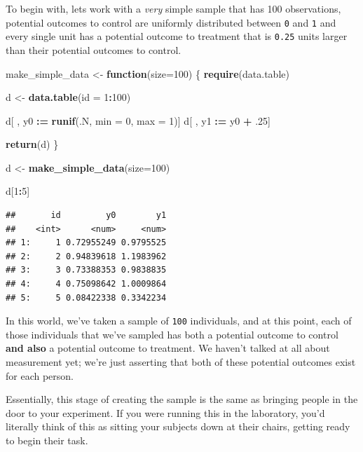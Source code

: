 \documentclass[
]{article}
\newenvironment{Shaded}{\begin{snugshade}}{\end{snugshade}}
\newcommand{\AttributeTok}[1]{\textcolor[rgb]{0.13,0.29,0.53}{#1}}
\newcommand{\ControlFlowTok}[1]{\textcolor[rgb]{0.13,0.29,0.53}{\textbf{#1}}}
\newcommand{\DecValTok}[1]{\textcolor[rgb]{0.00,0.00,0.81}{#1}}
\newcommand{\FunctionTok}[1]{\textcolor[rgb]{0.13,0.29,0.53}{\textbf{#1}}}
\newcommand{\NormalTok}[1]{#1}
\newcommand{\OtherTok}[1]{\textcolor[rgb]{0.56,0.35,0.01}{#1}}
\newcommand{\SpecialCharTok}[1]{\textcolor[rgb]{0.81,0.36,0.00}{\textbf{#1}}}
\theoremstyle{definition}
\theoremstyle{definition}
\theoremstyle{definition}
\theoremstyle{definition}
\theoremstyle{remark}
\begin{document}
To begin with, lets work with a \emph{very} simple sample that has 100 observations, potential outcomes to control are uniformly distributed between \texttt{0} and \texttt{1} and every single unit has a potential outcome to treatment that is \texttt{0.25} units larger than their potential outcomes to control.

\begin{Shaded}
\begin{Highlighting}[]
\NormalTok{make\_simple\_data }\OtherTok{\textless{}{-}} \ControlFlowTok{function}\NormalTok{(}\AttributeTok{size=}\DecValTok{100}\NormalTok{) \{ }
  \FunctionTok{require}\NormalTok{(data.table) }
  
\NormalTok{  d }\OtherTok{\textless{}{-}} \FunctionTok{data.table}\NormalTok{(}\AttributeTok{id =} \DecValTok{1}\SpecialCharTok{:}\DecValTok{100}\NormalTok{)  }
  
\NormalTok{  d[ , y0 }\SpecialCharTok{:=} \FunctionTok{runif}\NormalTok{(.N, }\AttributeTok{min =} \DecValTok{0}\NormalTok{, }\AttributeTok{max =} \DecValTok{1}\NormalTok{)]}
\NormalTok{  d[ , y1 }\SpecialCharTok{:=}\NormalTok{ y0 }\SpecialCharTok{+}\NormalTok{ .}\DecValTok{25}\NormalTok{]}
  
  \FunctionTok{return}\NormalTok{(d)}
\NormalTok{  \}}

\NormalTok{d }\OtherTok{\textless{}{-}} \FunctionTok{make\_simple\_data}\NormalTok{(}\AttributeTok{size=}\DecValTok{100}\NormalTok{)}

\NormalTok{d[}\DecValTok{1}\SpecialCharTok{:}\DecValTok{5}\NormalTok{]}
\end{Highlighting}
\end{Shaded}

\begin{verbatim}
##       id         y0        y1
##    <int>      <num>     <num>
## 1:     1 0.72955249 0.9795525
## 2:     2 0.94839618 1.1983962
## 3:     3 0.73388353 0.9838835
## 4:     4 0.75098642 1.0009864
## 5:     5 0.08422338 0.3342234
\end{verbatim}

In this world, we've taken a sample of \texttt{100} individuals, and at this point, each of those individuals that we've sampled has both a potential outcome to control \textbf{and also} a potential outcome to treatment. We haven't talked at all about measurement yet; we're just asserting that both of these potential outcomes exist for each person.

Essentially, this stage of creating the sample is the same as bringing people in the door to your experiment. If you were running this in the laboratory, you'd literally think of this as sitting your subjects down at their chairs, getting ready to begin their task.
\end{document}
